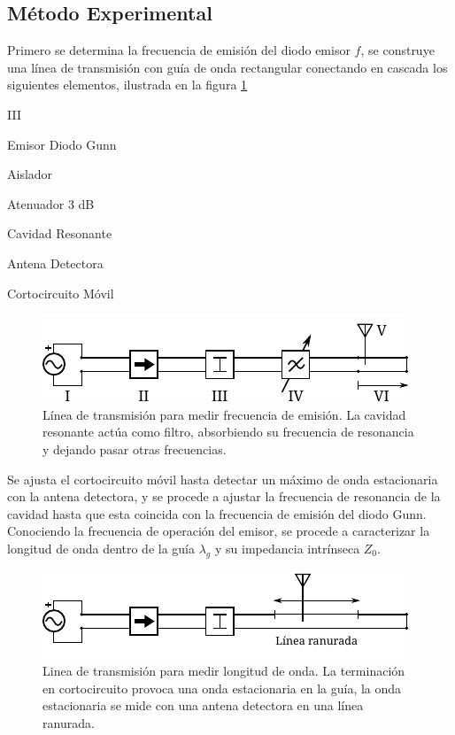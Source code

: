 \documentclass[11pt,a4paper]{article}
\begin{document}
\begin{multicols}{2}
\section{Método Experimental}

Primero se determina la frecuencia de emisión del diodo emisor $f$, se construye una línea de transmisión con guía de onda rectangular conectando en cascada los siguientes elementos, ilustrada en la figura \ref{fig:arr1}
\begin{multicols}{2}
    \begin{labeling}{III} 
        \item [I] Emisor Diodo Gunn
        \item [II] Aislador
        \item [III] Atenuador 3 dB
        \item [IV] Cavidad Resonante
        \item [V] Antena Detectora
        \item [VI] Cortocircuito Móvil
    \end{labeling}        
\end{multicols}
\begin{figure}[H]
    \centering
    \includegraphics[width=\linewidth]{Images/arreglo1.pdf}
    \caption{Línea de transmisión para medir frecuencia de emisión. La cavidad resonante actúa como filtro, absorbiendo su frecuencia de resonancia y dejando pasar otras frecuencias.}
    \label{fig:arr1}
\end{figure}
Se ajusta el cortocircuito móvil hasta detectar un máximo de onda estacionaria con la antena detectora, y se procede a ajustar la frecuencia de resonancia de la cavidad hasta que esta coincida con la frecuencia de emisión del diodo Gunn.\\

Conociendo la frecuencia de operación del emisor, se procede a caracterizar la longitud de onda dentro de la guía $\lambda_g$ y su impedancia intrínseca $Z_0$. 
\begin{figure}[H]
    \centering
    \includegraphics[width=\linewidth]{Images/arreglo2.pdf}
    \caption{Linea de transmisión para medir longitud de onda. La terminación en cortocircuito provoca una onda estacionaria en la guía, la onda estacionaria se mide con una antena detectora en una línea ranurada.}
    \label{fig:arr2}
\end{figure}


\end{multicols}
\end{document}
